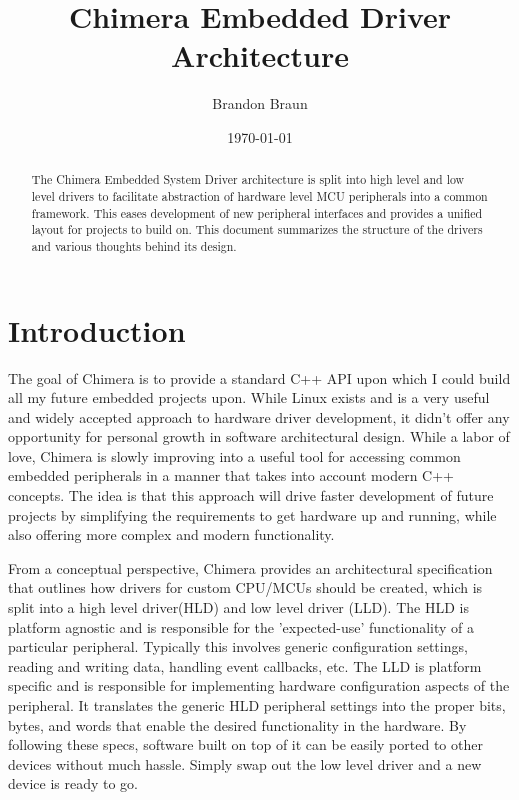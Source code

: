 \documentclass[10pt, letterpaper, tikz]{article}
\title{Chimera Embedded Driver Architecture}
\author{Brandon Braun}
\date{\today}
\begin{document}
  \begin{titlepage}
    \maketitle
  \end{titlepage}

\pagebreak
\tableofcontents

  \pagebreak
  \begin{abstract}
    The Chimera Embedded System Driver architecture is split into high level and low level drivers to facilitate
    abstraction of hardware level MCU peripherals into a common framework. This eases development of new
    peripheral interfaces and provides a unified layout for projects to build on. This document summarizes the
    structure of the drivers and various thoughts behind its design.
  \end{abstract}

  \section{Introduction}
    The goal of Chimera is to provide a standard C++ API upon which I could build all my future embedded projects upon.
    While Linux exists and is a very useful and widely accepted approach to hardware driver development, it didn't
    offer any opportunity for personal growth in software architectural design. While a labor of love, Chimera is
    slowly improving into a useful tool for accessing common embedded peripherals in a manner that takes into account
    modern C++ concepts. The idea is that this approach will drive faster development of future projects by simplifying
    the requirements to get hardware up and running, while also offering more complex and modern functionality.

    From a conceptual perspective, Chimera provides an architectural specification that outlines how drivers for custom
    CPU/MCUs should be created, which is split into a high level driver(HLD) and low level driver (LLD). The HLD is
    platform agnostic and is responsible for the 'expected-use' functionality of a particular peripheral. Typically this involves generic
    configuration settings, reading and writing data, handling event callbacks, etc. The LLD is platform specific and is
    responsible for implementing hardware configuration aspects of the peripheral. It translates the generic HLD peripheral
    settings into the proper bits, bytes, and words that enable the desired functionality in the hardware. By following these
    specs, software built on top of it can be easily ported to other devices without much hassle. Simply swap out the low level
    driver and a new device is ready to go.
\end{document}
